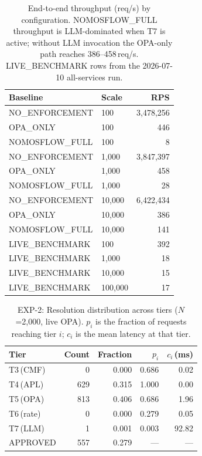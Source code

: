 \begin{table}[t]
\centering
\small
\caption{End-to-end throughput (req/s) by configuration.
  NOMOSFLOW\_FULL throughput is LLM-dominated when T7 is active;
  without LLM invocation the OPA-only path reaches 386–458\,req/s.
  LIVE\_BENCHMARK rows from the 2026-07-10 all-services run.}
\label{tab:exp1-throughput}
\begin{tabular}{llr}
\hline
\textbf{Baseline} & \textbf{Scale} & \textbf{RPS} \\
\hline
NO\_ENFORCEMENT  & 100     & 3{,}478{,}256 \\
OPA\_ONLY        & 100     &           446 \\
NOMOSFLOW\_FULL  & 100     &             8 \\
\hline
NO\_ENFORCEMENT  & 1{,}000   & 3{,}847{,}397 \\
OPA\_ONLY        & 1{,}000   &           458 \\
NOMOSFLOW\_FULL  & 1{,}000   &            28 \\
\hline
NO\_ENFORCEMENT  & 10{,}000  & 6{,}422{,}434 \\
OPA\_ONLY        & 10{,}000  &           386 \\
NOMOSFLOW\_FULL  & 10{,}000  &           141 \\
\hline
LIVE\_BENCHMARK  & 100     &           392 \\
LIVE\_BENCHMARK  & 1{,}000   &            18 \\
LIVE\_BENCHMARK  & 10{,}000  &            15 \\
LIVE\_BENCHMARK  & 100{,}000 &            17 \\
\hline
\end{tabular}
\end{table}

\begin{table}[t]
\centering
\small
\caption{EXP-2: Resolution distribution across tiers ($N$=2{,}000, live OPA).
  $p_i$ is the fraction of requests reaching tier $i$;
  $c_i$ is the mean latency at that tier.}
\label{tab:exp2-resolution}
\begin{tabular}{lrrrr}
\hline
\textbf{Tier} & \textbf{Count} & \textbf{Fraction} & \textbf{$p_i$} & \textbf{$c_i$\,(ms)} \\
\hline
T3\,(CMF)   &   0 & 0.000 & 0.686 & 0.02 \\
T4\,(APL)   & 629 & 0.315 & 1.000 & 0.00 \\
T5\,(OPA)   & 813 & 0.406 & 0.686 & 1.96 \\
T6\,(rate)  &   0 & 0.000 & 0.279 & 0.05 \\
T7\,(LLM)   &   1 & 0.001 & 0.003 & 92.82 \\
APPROVED    & 557 & 0.279 & —     & —     \\
\hline
\end{tabular}
\end{table}


